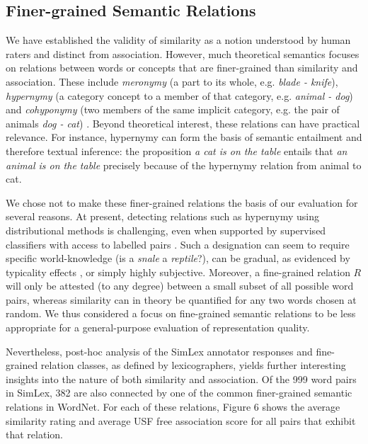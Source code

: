 \documentclass[fullname]{clv2}
\begin{document}
\subsection{Finer-grained Semantic Relations}

We have established the validity of similarity as a notion understood by human raters and distinct from association. However, much theoretical semantics focuses on relations between words or concepts that are finer-grained than similarity and association. These include \emph{meronymy} (a part to its whole, e.g. \emph{blade - knife}), \emph{hypernymy} (a category concept to a member of that category, e.g. \emph{animal - dog}) and \emph{cohyponymy} (two members of the same implicit category, e.g. the pair of animals \emph{dog - cat}) \cite{cruse1986lexical}. Beyond theoretical interest, these relations can have practical relevance. For instance, hypernymy can form the basis of semantic entailment and therefore textual inference: the proposition \emph{a cat is on the table} entails that \emph{an animal is on the table} precisely because of the hypernymy relation from animal to cat. 

We chose not to make these finer-grained relations the basis of our evaluation for several reasons. At present, detecting relations such as hypernymy using distributional methods is challenging, even when supported by supervised classifiers with access to labelled pairs \cite{levysupervised}. Such a designation can seem to require specific world-knowledge (is a \emph{snale} a \emph{reptile}?), can be gradual, as evidenced by typicality effects \cite{rosch1976structural}, or simply highly subjective. Moreover, a fine-grained relation \(R\) will only be attested (to any degree) between a small subset of all possible word pairs, whereas similarity can in theory be quantified for any two words chosen at random. We thus considered a focus on fine-grained semantic relations to be less appropriate for a general-purpose evaluation of representation quality.  

Nevertheless, post-hoc analysis of the SimLex annotator responses and fine-grained relation classes, as defined by lexicographers, yields further interesting insights into the nature of both similarity and association. Of the 999 word pairs in SimLex, 382 are also connected by one of the common finer-grained semantic relations in WordNet. For each of these relations, Figure 6 shows the average similarity rating and average USF free association score for all pairs that exhibit that relation. 
\end{document}
